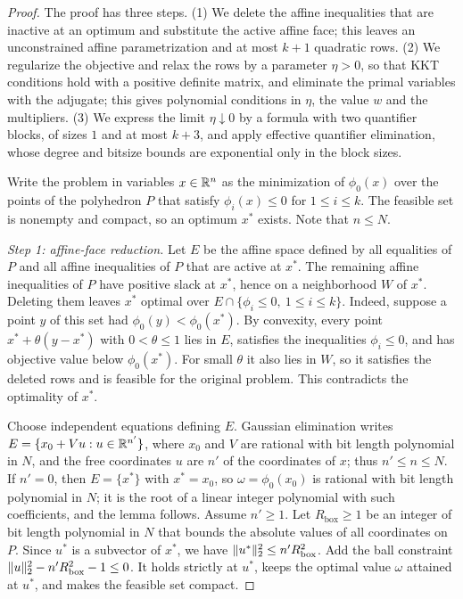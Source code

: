 \begin{proof}
The proof has three steps. (1) We delete the affine inequalities that are
inactive at an optimum and substitute the active affine face; this leaves
an unconstrained affine parametrization and at most $k+1$ quadratic rows.
(2) We regularize the objective and relax the rows by a parameter
$\eta>0$, so that KKT conditions hold with a positive definite matrix, and
eliminate the primal variables with the adjugate; this gives polynomial
conditions in $\eta$, the value $w$ and the multipliers. (3) We express
the limit $\eta\downarrow0$ by a formula with two quantifier blocks, of
sizes $1$ and at most $k+3$, and apply effective quantifier elimination,
whose degree and bitsize bounds are exponential only in the block sizes.

Write the problem in variables $x\in\mathbb R^n$ as the minimization of
$\phi_0(x)$ over the points of the polyhedron $P$ that satisfy
$\phi_i(x)\le0$ for $1\le i\le k$. The feasible set is nonempty and
compact, so an optimum $x^*$ exists. Note that $n\le N$.

\emph{Step 1: affine-face reduction.}
Let $E$ be the affine space defined by all equalities of $P$ and all
affine inequalities of $P$ that are active at $x^*$. The remaining affine
inequalities of $P$ have positive slack at $x^*$, hence on a neighborhood
$W$ of $x^*$. Deleting them leaves $x^*$ optimal over
$E\cap\{\phi_i\le0,\ 1\le i\le k\}$. Indeed, suppose a point $y$ of this
set had $\phi_0(y)<\phi_0(x^*)$. By convexity, every point
$x^*+\theta(y-x^*)$ with $0<\theta\le1$ lies in $E$, satisfies the
inequalities $\phi_i\le0$, and has objective value below $\phi_0(x^*)$.
For small $\theta$
it also lies in $W$, so it satisfies the deleted rows and is feasible for
the original problem. This contradicts the optimality of $x^*$.

Choose independent equations defining $E$. Gaussian elimination writes
$E=\{x_0+Vu:u\in\mathbb R^{n'}\}$, where $x_0$ and $V$ are rational with bit
length polynomial in $N$, and the free coordinates $u$ are $n'$ of the
coordinates of $x$; thus $n'\le n\le N$. If $n'=0$, then $E=\{x^*\}$ with
$x^*=x_0$, so $\omega=\phi_0(x_0)$ is rational with bit length polynomial
in $N$; it is the root of a linear integer polynomial with such
coefficients, and the lemma follows. Assume $n'\ge1$. Let
$R_{\mathrm{box}}\ge1$ be an integer of bit length polynomial in $N$ that
bounds the absolute values of all coordinates on $P$. Since $u^*$ is a
subvector of $x^*$, we have $\lVert u^*\rVert_2^2\le n'R_{\mathrm{box}}^2$. Add
the ball constraint $\lVert u\rVert_2^2-n'R_{\mathrm{box}}^2-1\le0$. It holds
strictly at $u^*$, keeps the optimal value $\omega$ attained at $u^*$, and
makes the feasible set compact.


\end{proof}
